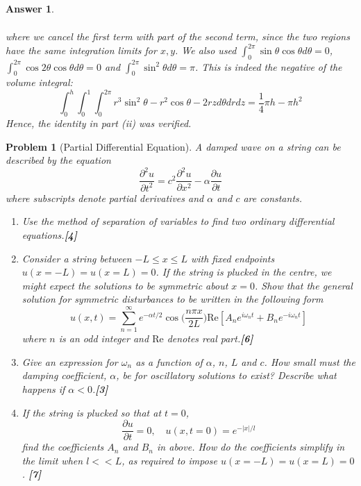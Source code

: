 \documentclass[a4paper]{article}
\newtheorem{ans}{Answer}[section]
\theoremstyle{new}
\newtheorem{qns}{Problem}[section]
\begin{document}
\begin{ans}
\begin{enumerate}[label=(\roman*)]
\begin{eqnarray}
\end{eqnarray}
where we cancel the first term with part of the second term, since the two regions have the same integration limits for $x,y$. We also used $\int_0^{2\pi}\sin\theta\cos\theta d\theta=0$, $\int_0^{2\pi}\cos2\theta\cos\theta d\theta=0$ and $\int_0^{2\pi}\sin^2\theta d\theta=\pi$. This is indeed the negative of the volume integral:
$$\int_0^h\int_0^1\int_0^{2\pi}r^3\sin^2\theta-r^2\cos\theta-2rzd\theta drdz=\frac{1}{4}\pi h-\pi h^2$$
Hence, the identity in part (ii) was verified.
\end{enumerate}
\end{ans}
\newpage
\begin{qns}[Partial Differential Equation]
A damped wave on a string can be described by the equation
$$\frac{\partial^2u}{\partial t^2}=c^2\frac{\partial^2u}{\partial x^2}-\alpha\frac{\partial u}{\partial t}$$
where subscripts denote partial derivatives and $\alpha$ and $c$ are constants.
\begin{enumerate}[label=(\roman*)]
    \item Use the method of separation of variables to find two ordinary differential equations.\hfill \textbf{[4]}
    \item Consider a string between $-L\leq x\leq L$ with fixed endpoints $u(x=-L)=u(x=L)=0$. If the string is plucked in the centre, we might expect the solutions to be symmetric about $x=0$. Show that the general solution for symmetric disturbances to be written in the following form
\begin{equation}
u(x,t)=\sum_{n=1}^\infty e^{-\alpha t/2}\cos\bigg(\frac{n\pi x}{2L}\bigg)\text{Re}[A_ne^{i\omega_nt}+B_ne^{-i\omega_nt}]\tag{*}
\end{equation}
where $n$ is an odd integer and $\text{Re}$ denotes real part.\hfill \textbf{[6]}
\item Give an expression for $\omega_n$ as a function of $\alpha$, $n$, $L$ and $c$. How small must the damping coefficient, $\alpha$, be for oscillatory solutions to exist? Describe what happens if $\alpha<0$.\hfill \textbf{[3]}
\item If the string is plucked so that at $t=0$,
$$\frac{\partial u}{\partial t}=0,\quad u(x,t=0)=e^{-|x|/l}$$
find the coefficients $A_n$ and $B_n$ in above. How do the coefficients simplify in the limit when $l<<L$, as required to impose $u(x=-L)=u(x=L)=0$. \hfill \textbf{[7]}
\end{enumerate}
\end{qns}
\end{document}
